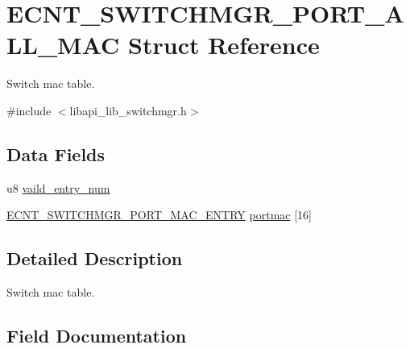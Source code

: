\hypertarget{structECNT__SWITCHMGR__PORT__ALL__MAC}{}\section{E\+C\+N\+T\+\_\+\+S\+W\+I\+T\+C\+H\+M\+G\+R\+\_\+\+P\+O\+R\+T\+\_\+\+A\+L\+L\+\_\+\+M\+AC Struct Reference}
\label{structECNT__SWITCHMGR__PORT__ALL__MAC}


Switch mac table.  




{\ttfamily \#include $<$libapi\+\_\+lib\+\_\+switchmgr.\+h$>$}

\subsection*{Data Fields}
\begin{DoxyCompactItemize}
\item 
u8 \hyperlink{structECNT__SWITCHMGR__PORT__ALL__MAC_a17e58ecee8378848306dc6dc559a2451}{vaild\+\_\+entry\+\_\+num}
\item 
\hyperlink{structECNT__SWITCHMGR__PORT__MAC__ENTRY}{E\+C\+N\+T\+\_\+\+S\+W\+I\+T\+C\+H\+M\+G\+R\+\_\+\+P\+O\+R\+T\+\_\+\+M\+A\+C\+\_\+\+E\+N\+T\+RY} \hyperlink{structECNT__SWITCHMGR__PORT__ALL__MAC_ae49984afe0a2488fbd98ec590038bfd9}{portmac} \mbox{[}16\mbox{]}
\end{DoxyCompactItemize}


\subsection{Detailed Description}
Switch mac table. 

\subsection{Field Documentation}
\mbox{\label{structECNT__SWITCHMGR__PORT__ALL__MAC_ae49984afe0a2488fbd98ec590038bfd9}} 
